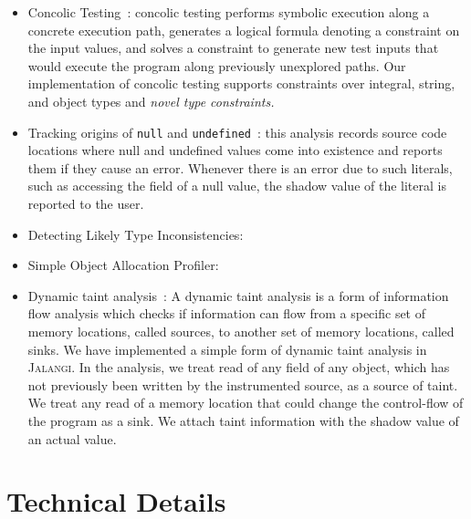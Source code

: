 \documentclass{sig-alternate}
\def\jalangi{\textsc{Jalangi}}
\begin{document}
\begin{itemize}
\item Concolic Testing~\cite{dart,cute}: concolic testing performs
  symbolic execution along a concrete execution path, generates a
  logical formula denoting a constraint on the input values, and
  solves a constraint to generate new test inputs that would execute
  the program along previously unexplored paths.  Our implementation
  of concolic testing supports constraints over integral, string, and
  object types and \emph{novel type constraints.}
\item Tracking origins of \texttt{null} and
  \texttt{undefined}~\cite{Bond:2007:TBA:1297027.1297057}: this
  analysis records source code locations where null and undefined
  values come into existence and reports them if they cause an error.
  Whenever there is an error due to such literals, such as accessing
  the field of a null value, the shadow value of the literal is
  reported to the user.
\item Detecting Likely Type Inconsistencies:
\item Simple Object Allocation Profiler:
\item Dynamic taint
  analysis~\cite{songndss05,Clause:2007:DGD:1273463.1273490}: A
  dynamic taint analysis is a form of information flow analysis which
  checks if information can flow from a specific set of memory
  locations, called sources, to another set of memory locations,
  called sinks.  We have implemented a simple form of dynamic taint
  analysis in \jalangi{}.  In the analysis, we treat read of any field
  of any object, which has not previously been written by the
  instrumented source, as a source of taint.  We treat any read of a
  memory location that could change the control-flow of the program as
  a sink.  We attach taint information with the shadow value of an
  actual value.
\end{itemize}

\section{Technical Details}
\label{sec:technical-details}
\end{document}
